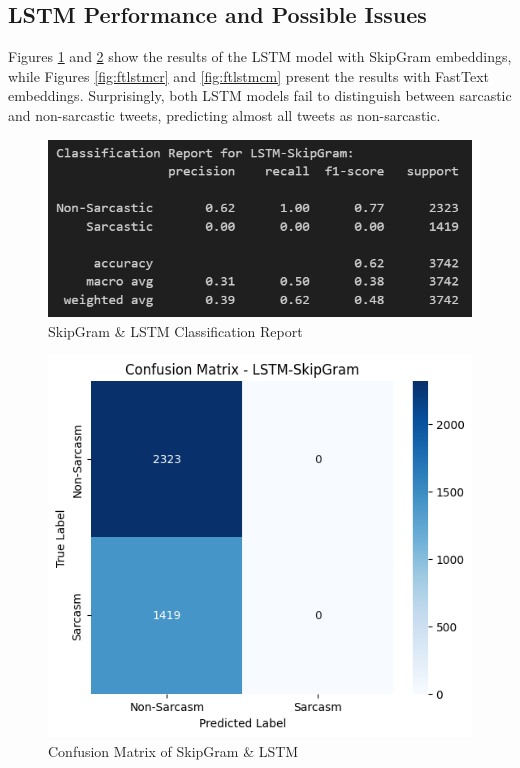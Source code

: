 \documentclass[11pt]{article}
\begin{document}
\subsection{LSTM Performance and Possible Issues}
Figures \ref{fig:sglstmcr} and \ref{fig:sglstmcm} show the results of the LSTM model with SkipGram embeddings, while Figures \ref{fig:ftlstmcr} and \ref{fig:ftlstmcm} present the results with FastText embeddings. Surprisingly, both LSTM models fail to distinguish between sarcastic and non-sarcastic tweets, predicting almost all tweets as non-sarcastic.
\begin{figure}[htbp]
    \centering
    \includegraphics[width=.8\linewidth]{pic/LSTM-Skipgram-Report.png}
    \caption{SkipGram \& LSTM Classification Report}
    \label{fig:sglstmcr}
\end{figure}
\begin{figure}[htbp]
    \centering
    \includegraphics[width=.8\linewidth]{pic/LSTM-Skipgram-Matrix.png}
    \caption{Confusion Matrix of SkipGram \& LSTM}
    \label{fig:sglstmcm}
\end{figure}
\end{document}
